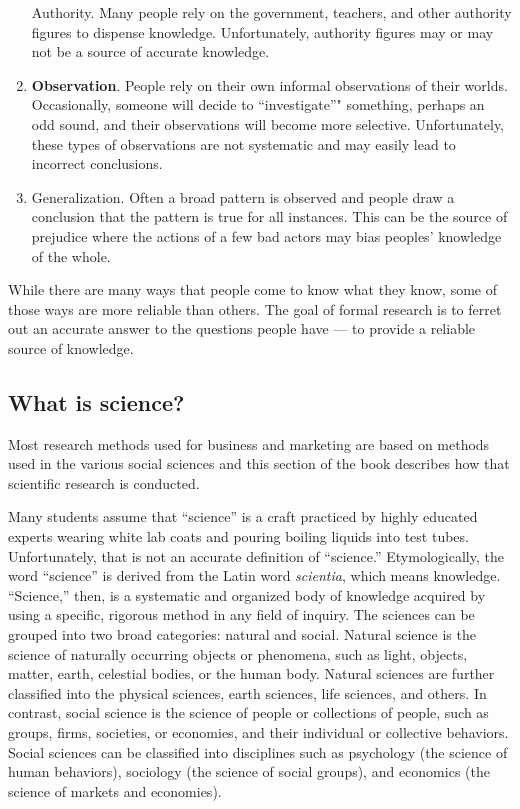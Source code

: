 \documentclass[]{book}
\theoremstyle{definition}
\theoremstyle{definition}
\theoremstyle{definition}
\theoremstyle{remark}
\begin{document}
\begin{enumerate}
  Authority. Many people rely on the government, teachers, and other
  authority figures to dispense knowledge. Unfortunately, authority
  figures may or may not be a source of accurate knowledge.
\item
  \textbf{Observation}. People rely on their own informal observations
  of their worlds. Occasionally, someone will decide to ``investigate''"
  something, perhaps an odd sound, and their observations will become
  more selective. Unfortunately, these types of observations are not
  systematic and may easily lead to incorrect conclusions.
\item
  Generalization. Often a broad pattern is observed and people draw a
  conclusion that the pattern is true for all instances. This can be the
  source of prejudice where the actions of a few bad actors may bias
  peoples' knowledge of the whole.
\end{enumerate}

While there are many ways that people come to know what they know, some
of those ways are more reliable than others. The goal of formal research
is to ferret out an accurate answer to the questions people have --- to
provide a reliable source of knowledge.

\hypertarget{what-is-science}{%
\subsection{What is science?}\label{what-is-science}}

Most research methods used for business and marketing are based on
methods used in the various social sciences and this section of the book
describes how that scientific research is conducted.

Many students assume that ``science'' is a craft practiced by highly
educated experts wearing white lab coats and pouring boiling liquids
into test tubes. Unfortunately, that is not an accurate definition of
``science.'' Etymologically, the word ``science'' is derived from the
Latin word \emph{scientia}, which means knowledge. ``Science,'' then, is
a systematic and organized body of knowledge acquired by using a
specific, rigorous method in any field of inquiry. The sciences can be
grouped into two broad categories: natural and social. Natural science
is the science of naturally occurring objects or phenomena, such as
light, objects, matter, earth, celestial bodies, or the human body.
Natural sciences are further classified into the physical sciences,
earth sciences, life sciences, and others. In contrast, social science
is the science of people or collections of people, such as groups,
firms, societies, or economies, and their individual or collective
behaviors. Social sciences can be classified into disciplines such as
psychology (the science of human behaviors), sociology (the science of
social groups), and economics (the science of markets and economies).
\end{document}

